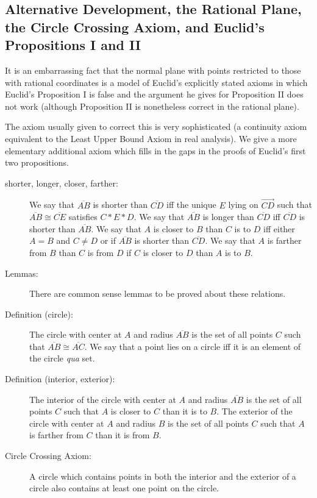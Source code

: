 \documentclass[12pt]{article}
\begin{document}
\subsection{Alternative Development, the Rational Plane, the Circle Crossing Axiom, and Euclid's Propositions I and II}

It is an embarrassing fact that the normal plane with points restricted to those with rational coordinates is a model of Euclid's explicitly stated axioms in which
Euclid's Proposition I is false and the argument he gives for Proposition II does not work (although Proposition II is nonetheless correct in the rational plane).

The axiom usually given to correct this is very sophisticated (a continuity axiom equivalent to the Least Upper Bound Axiom in real analysis).  We give a more elementary
additional axiom which fills in the gaps in the proofs of Euclid's first two propositions.

\begin{description}

\item[shorter, longer, closer, farther:]  We say that $\overline{AB}$ is shorter than $\overline{CD}$ iff the unique $E$ lying on $\overrightarrow{CD}$ such that $\overline{AB} \cong \overline{CE}$  satisfies $C*E*D$.   We say that  $\overline{AB}$ is longer than $\overline{CD}$ iff $\overline{CD}$ is shorter than $\overline{AB}$.  We say that $A$ is closer to $B$ than $C$ is to $D$ iff either $A=B$ and $C \neq D$ or if $\overline{AB}$ is shorter than $\overline{CD}$.  We say that $A$ is farther from $B$ than $C$ is from $D$ if $C$ is closer to $D$ than $A$ is to $B$.

\item[Lemmas:] There are common sense lemmas to be proved about these relations.

\item[Definition (circle):]  The circle with center at $A$ and radius $\overline{AB}$ is the set of all points $C$ such that $\overline{AB} \cong \overline{AC}$.  We say that a point lies on a circle iff it is an element of the circle {\em qua} set.

\item[Definition (interior, exterior):]  The interior of the circle with center at $A$ and radius $\overline{AB}$ is the set of all points $C$ such that $A$ is closer to $C$ than it is to $B$.  The exterior of the circle with center at $A$ and radius $B$ is the set of all points $C$ such that $A$ is farther from $C$ than it is from $B$.

\item[Circle Crossing Axiom:]  A circle  which contains points in both the interior and the exterior of a circle also contains at least one point on the circle.

\end{description}
\end{document}
